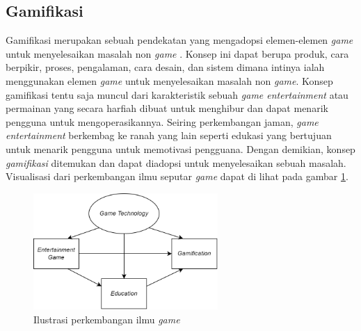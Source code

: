 \subsection{Gamifikasi}
Gamifikasi merupakan sebuah pendekatan yang mengadopsi elemen-elemen \textit{game} untuk menyelesaikan masalah non \textit{game} \cite{marisa2020gamifikasi}.
Konsep ini dapat berupa produk, cara berpikir, proses, pengalaman, cara desain, dan sistem dimana intinya ialah menggunakan elemen \textit{game} untuk menyelesaikan masalah non \textit{game}. 
Konsep gamifikasi tentu saja muncul dari karakteristik sebuah \textit{game entertainment} atau permainan yang secara harfiah dibuat untuk menghibur dan dapat menarik pengguna untuk mengoperasikannya.
Seiring perkembangan jaman, \textit{game entertainment} berkembag ke ranah yang lain seperti edukasi yang bertujuan untuk menarik pengguna untuk memotivasi pengguana.
Dengan demikian, konsep \textit{gamifikasi} ditemukan dan dapat diadopsi untuk menyelesaikan sebuah masalah. Visualisasi dari perkembangan ilmu seputar \textit{game} dapat di lihat pada gambar \ref*{Fig:Ilustrasi perkembangan ilmu game}.
\begin{figure}[H]
	\centering
	\includegraphics[width=7cm]{contents/chapter-2/images/perkembangan-game.png}
	\caption[Caption]{Ilustrasi perkembangan ilmu \textit{game} \cite{2004activity}}
	\label{Fig:Ilustrasi perkembangan ilmu game}
\end{figure}
